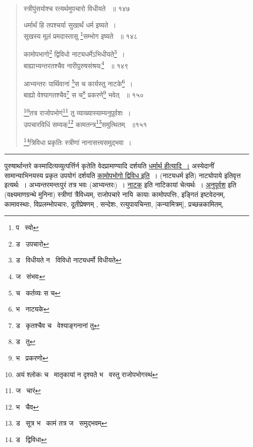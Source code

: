 \documentclass[11pt, openany]{book}
\begin{document}
{\newpage

\begin{quote}
 {\na स्त्रीपुंसयोश्च रत्यर्थमुपचारो विधीयते ~॥ १४७ 

धर्मार्थं हि तपश्चर्या सुखार्थं धर्म इष्यते~।\\ 
सुखस्य मूलं प्रमदास्तासु \renewcommand{\thefootnote}{1}\footnote{प \textendash\ स्वो}सम्भोग इष्यते ~॥ १४८ 

कामोपभागो\renewcommand{\thefootnote}{2}\footnote{ड \textendash\ उपचारो } द्विविधो नाट्यधर्मेऽभिधीयते\renewcommand{\thefootnote}{3}\footnote{ड \textendash\ विधीयते न \textendash\ विविधो नाट्यधर्मो विधीयते}~।\\ 
बाह्याभ्यन्तरतश्चैव नारीपुरुषसंश्रयः\renewcommand{\thefootnote}{4}\footnote{ज \textendash\ संभवः } ~॥ १४९ 

आभ्यन्तरः पार्थिवानां \renewcommand{\thefootnote}{5}\footnote{च \textendash\ कर्तव्यः स च }स च कार्यस्तु नाटके\renewcommand{\thefootnote}{6}\footnote{भ \textendash\ नाट्यके}~। \\
बाह्यो वेश्यागतश्चैव\renewcommand{\thefootnote}{7}\footnote{ड \textendash\ कृतश्चैव च \textendash\ वेश्याङ्गनानां तु} स च\renewcommand{\thefootnote}{8}\footnote{ड \textendash\ तु } प्रकरणे\renewcommand{\thefootnote}{9}\footnote{भ \textendash\ प्रकरणो} भवेत् ~॥ १५० 

\renewcommand{\thefootnote}{10}\footnote{अयं श्लोकः च \textendash\ मातृकायां न दृश्यते भ \textendash\ वस्तु राजोपभोगस्थं}तत्र राजोपभोगं\renewcommand{\thefootnote}{11}\footnote{ज \textendash\ चारं} तु व्याख्यास्याम्यनुपूर्वशः~। \\
उपचारविधिं सम्यक्\renewcommand{\thefootnote}{12}\footnote{भ \textendash\ चैव } कामतन्त्र\renewcommand{\thefootnote}{13}\footnote{ड \textendash\ सूत्र भ \textendash\ कामं तत्र ज \textendash\ समुद्भवम्}समुत्थितम् ~॥१५१ 

\renewcommand{\thefootnote}{14}\footnote{ड \textendash\ द्विविधा }त्रिविधा प्रकृतिः स्त्रीणां नानासत्त्वसमुद्भवा~।}
\end{quote}

\hrule

\vspace{2mm}
 
\begin{sloppypar}
पुरुषार्थान्तरे कस्मादित्यव्युत्पर्त्तिर्न कृतेति वेदप्रामाण्यादि दर्शयति \underline{धर्मार्थ हीत्यादि~।} अस्येदानीं सामान्याभिनयस्य प्रकृत उपयोगं दर्शयति \underline{कामोपभोगो द्विविध इति}~। (नाट्यधर्म इति) नाट्योपाये इतिवृत्त इत्यर्थः~। अभ्यन्तरमन्तःपुरं तत्र भवः (आभ्यन्तरः)~। \underline{नाटक} इति नाटिकायां चेत्यर्थः~। \underline{अनुपूर्वश} इति (वक्ष्यमाणग्रन्थे मुनिना) स्त्रीणां त्रैविध्यम्, राजोपचारे नायि\textendash\ कायाः कामोपपत्तिः, इङ्गितं इष्टवेदनम्, कामावस्थाः, विप्रलम्भोपचारः, दूतीप्रेषणम् , सन्देशः, रत्युपायचिन्ता, [कन्यामित्रम्], प्रच्छन्नकामितम्, 
\end{sloppypar} 

}
\end{document}
